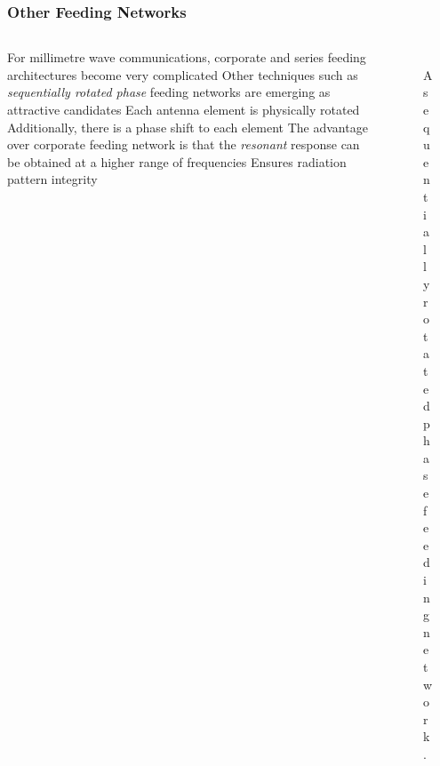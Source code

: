 \documentclass[10pt]{beamer}
\begin{document}
\begin{frame}
    \frametitle{Other Feeding Networks}
    \begin{columns}[] %
        \begin{column}{.7\textwidth}
            \begin{outline}
                \small
                \1 For millimetre wave communications, corporate and series feeding architectures become very complicated
                \1 Other techniques such as \textit{sequentially rotated phase} feeding networks are emerging as attractive candidates
                \2 Each antenna element is physically rotated
                \2 Additionally, there is a phase shift to each element
                \1 The advantage over corporate feeding network is that the \textit{resonant} response can be obtained at a higher range of frequencies
                \2 Ensures radiation pattern integrity
            \end{outline}   
        \end{column}
        \begin{column}{.4\textwidth}
            \begin{figure}[h!]
                \centering
                \includegraphics[width=.95\textwidth]{SRP.pdf}
                \caption{\small A sequentially rotated phase feeding network \footnotemark[1].}
            \end{figure}
        \end{column}%
    \end{columns}
\end{frame}
\end{document}

